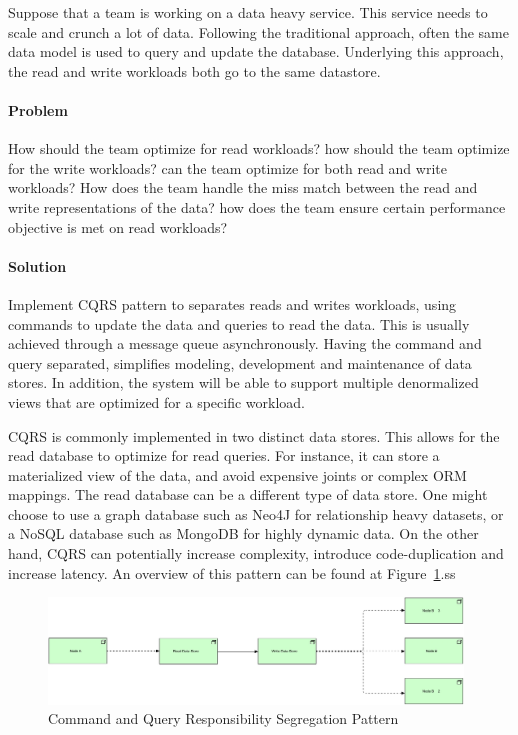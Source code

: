 \documentclass{bmcart}
\begin{document}
Suppose that a team is working on a data heavy service. This service needs to scale and crunch a lot of data. Following the traditional approach, often the same data model is used to query and update the database. Underlying this approach, the read and write workloads both go to the same datastore.

\paragraph{Problem}
How should the team optimize for read workloads? how should the team optimize for the write workloads? can the team optimize for both read and write workloads? How does the team handle the miss match between the read and write representations of the data? how does the team ensure certain performance objective is met on read workloads?

\paragraph{Solution}

Implement CQRS pattern to separates reads and writes workloads, using commands to update the data and queries to read the data. This is usually achieved through a message queue asynchronously. Having the command and query separated, simplifies modeling, development and maintenance of data stores. In addition, the system will be able to support multiple denormalized views that are optimized for a specific workload. 

CQRS is commonly implemented in two distinct data stores. This allows for the read database to optimize for read queries. For instance, it can store a materialized view of the data, and avoid expensive joints or complex ORM mappings. The read database can be a different type of data store. One might choose to use a graph database such as Neo4J for relationship heavy datasets, or a NoSQL database such as MongoDB for highly dynamic data. On the other hand, CQRS can potentially increase complexity, introduce code-duplication and increase latency. An overview of this pattern can be found at Figure~\ref{CQRS}.ss

\begin{figure}[h]
  \includegraphics[width=11cm]{Media/Command and Query Responsibility Segregation.jpg}
  \caption{Command and Query Responsibility Segregation Pattern}
  \label{CQRS}
\end{figure}
\end{document}
